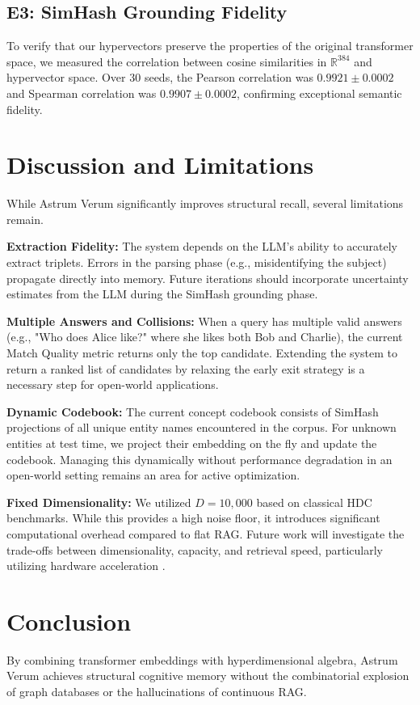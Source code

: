 \documentclass[11pt,letterpaper]{article}
\begin{document}
\subsection{E3: SimHash Grounding Fidelity}
To verify that our hypervectors preserve the properties of the original transformer space, we measured the correlation between cosine similarities in $\mathbb{R}^{384}$ and hypervector space. Over 30 seeds, the Pearson correlation was $0.9921 \pm 0.0002$ and Spearman correlation was $0.9907 \pm 0.0002$, confirming exceptional semantic fidelity.

\section{Discussion and Limitations}
\label{sec:discussion}

While Astrum Verum significantly improves structural recall, several limitations remain. 

\textbf{Extraction Fidelity:} The system depends on the LLM's ability to accurately extract triplets. Errors in the parsing phase (e.g., misidentifying the subject) propagate directly into memory. Future iterations should incorporate uncertainty estimates from the LLM during the SimHash grounding phase.

\textbf{Multiple Answers and Collisions:} When a query has multiple valid answers (e.g., "Who does Alice like?" where she likes both Bob and Charlie), the current Match Quality metric returns only the top candidate. Extending the system to return a ranked list of candidates by relaxing the early exit strategy is a necessary step for open-world applications.

\textbf{Dynamic Codebook:} The current concept codebook consists of SimHash projections of all unique entity names encountered in the corpus. For unknown entities at test time, we project their embedding on the fly and update the codebook. Managing this dynamically without performance degradation in an open-world setting remains an area for active optimization.

\textbf{Fixed Dimensionality:} We utilized $D=10{,}000$ based on classical HDC benchmarks. While this provides a high noise floor, it introduces significant computational overhead compared to flat RAG. Future work will investigate the trade-offs between dimensionality, capacity, and retrieval speed, particularly utilizing hardware acceleration \cite{kleyko2022vector}.

\section{Conclusion}
By combining transformer embeddings with hyperdimensional algebra, Astrum Verum achieves structural cognitive memory without the combinatorial explosion of graph databases or the hallucinations of continuous RAG. 
\end{document}
